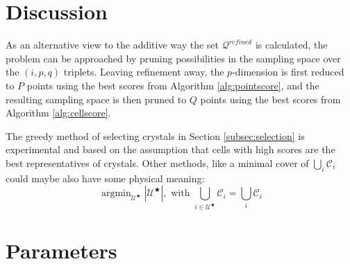 \documentclass[a4paper,10pt]{article}
\DeclareMathOperator*{\argmin}{argmin}
\begin{document}
\section{Discussion}

As an alternative view to the additive way the set $\mathcal{Q}^{refined}$ is calculated, the problem can be approached by pruning possibilities in the sampling space over the $(i,p,q)$ triplets. Leaving refinement away, the $p$-dimension is first reduced to $P$ points using the best scores from Algorithm \ref{alg:pointscore}, and the resulting sampling space is then pruned to $Q$ points using the best scores from Algorithm \ref{alg:cellscore}.

The greedy method of selecting crystals in Section \ref{subsec:selection} is experimental and based on the assumption that cells with high scores are the best representatives of crystals. Other methods, like a minimal cover of $\bigcup_i \mathcal{C}_i$ could maybe also have some physical meaning:
%
\[
 \argmin_{\mathcal{U}^\bigstar} |\mathcal{U}^\bigstar|, \text{ with }\bigcup_{i\in \mathcal{U}^\bigstar} \mathcal{C}_i = \bigcup_i \mathcal{C}_i
\]

\section{Parameters}
\end{document}
